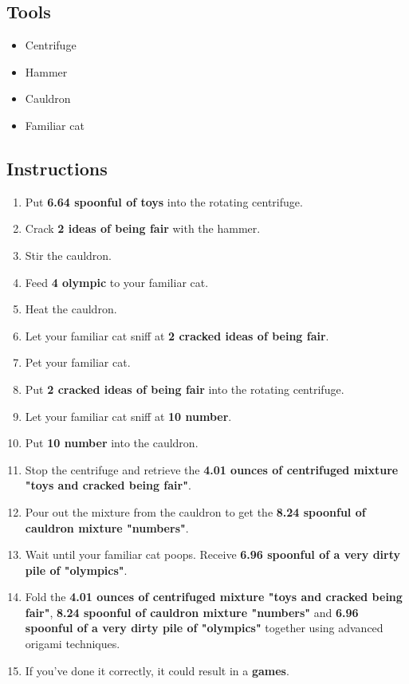 \documentclass{article}
\begin{document}
\subsection{Tools}\begin{itemize}
\item 
Centrifuge
\item 
Hammer
\item 
Cauldron
\item 
Familiar cat
\end{itemize}
\subsection{Instructions}\begin{enumerate}
\item 
Put \textbf{6.64 spoonful of toys} into the rotating centrifuge.
\item 
Crack \textbf{2 ideas of being fair} with the hammer.
\item 
Stir the cauldron.
\item 
Feed \textbf{4 olympic} to your familiar cat.
\item 
Heat the cauldron.
\item 
Let your familiar cat sniff at \textbf{2 cracked ideas of being fair}.
\item 
Pet your familiar cat.
\item 
Put \textbf{2 cracked ideas of being fair} into the rotating centrifuge.
\item 
Let your familiar cat sniff at \textbf{10 number}.
\item 
Put \textbf{10 number} into the cauldron.
\item 
Stop the centrifuge and retrieve the \textbf{4.01 ounces of centrifuged mixture "toys and cracked being fair"}.
\item 
Pour out the mixture from the cauldron to get the \textbf{8.24 spoonful of cauldron mixture "numbers"}.
\item 
Wait until your familiar cat poops. Receive \textbf{6.96 spoonful of a very dirty pile of "olympics"}.
\item 
Fold the \textbf{4.01 ounces of centrifuged mixture "toys and cracked being fair"}, \textbf{8.24 spoonful of cauldron mixture "numbers"} and \textbf{6.96 spoonful of a very dirty pile of "olympics"} together using advanced origami techniques.
\item 
If you've done it correctly, it could result in a \textbf{games}.
\end{enumerate}
\newpage
\end{document}
